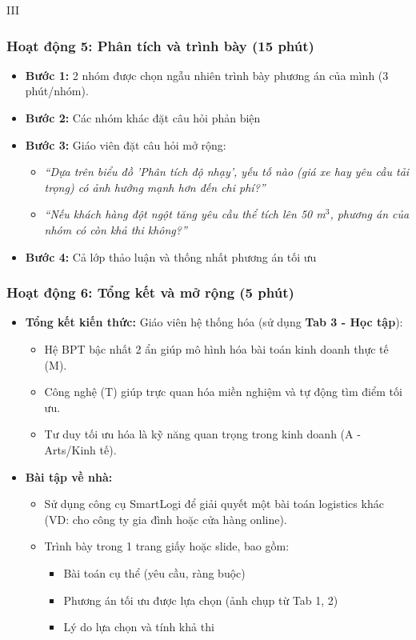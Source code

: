 \documentclass[12pt,a4paper]{article}
\begin{document}
\begin{competitionsection}{III}
\subsubsection*{Hoạt động 5: Phân tích và trình bày (15 phút)}
\begin{itemize}[leftmargin=*,noitemsep]
\item \textbf{Bước 1:} 2 nhóm được chọn ngẫu nhiên trình bày phương án của mình (3 phút/nhóm).
\item \textbf{Bước 2:} Các nhóm khác đặt câu hỏi phản biện
\item \textbf{Bước 3:} Giáo viên đặt câu hỏi mở rộng:
    \begin{itemize}
    \item \textit{``Dựa trên biểu đồ 'Phân tích độ nhạy', yếu tố nào (giá xe hay yêu cầu tải trọng) có ảnh hưởng mạnh hơn đến chi phí?''}
    \item \textit{``Nếu khách hàng đột ngột tăng yêu cầu thể tích lên 50 m$^3$, phương án của nhóm có còn khả thi không?''}
    \end{itemize}
\item \textbf{Bước 4:} Cả lớp thảo luận và thống nhất phương án tối ưu
\end{itemize}

\subsubsection*{Hoạt động 6: Tổng kết và mở rộng (5 phút)}
\begin{itemize}[leftmargin=*,noitemsep]
\item \textbf{Tổng kết kiến thức:} Giáo viên hệ thống hóa (sử dụng \textbf{Tab 3 - Học tập}):
    \begin{itemize}
    \item Hệ BPT bậc nhất 2 ẩn giúp mô hình hóa bài toán kinh doanh thực tế (M).
    \item Công nghệ (T) giúp trực quan hóa miền nghiệm và tự động tìm điểm tối ưu.
    \item Tư duy tối ưu hóa là kỹ năng quan trọng trong kinh doanh (A - Arts/Kinh tế).
    \end{itemize}
\item \textbf{Bài tập về nhà:}
    \begin{itemize}
    \item Sử dụng công cụ SmartLogi để giải quyết một bài toán logistics khác (VD: cho công ty gia đình hoặc cửa hàng online).
    \item Trình bày trong 1 trang giấy hoặc slide, bao gồm:
        \begin{itemize}
        \item Bài toán cụ thể (yêu cầu, ràng buộc)
        \item Phương án tối ưu được lựa chọn (ảnh chụp từ Tab 1, 2)
        \item Lý do lựa chọn và tính khả thi
        \end{itemize}
    \end{itemize}
\end{itemize}
\end{competitionsection}
\newpage
\end{document}

